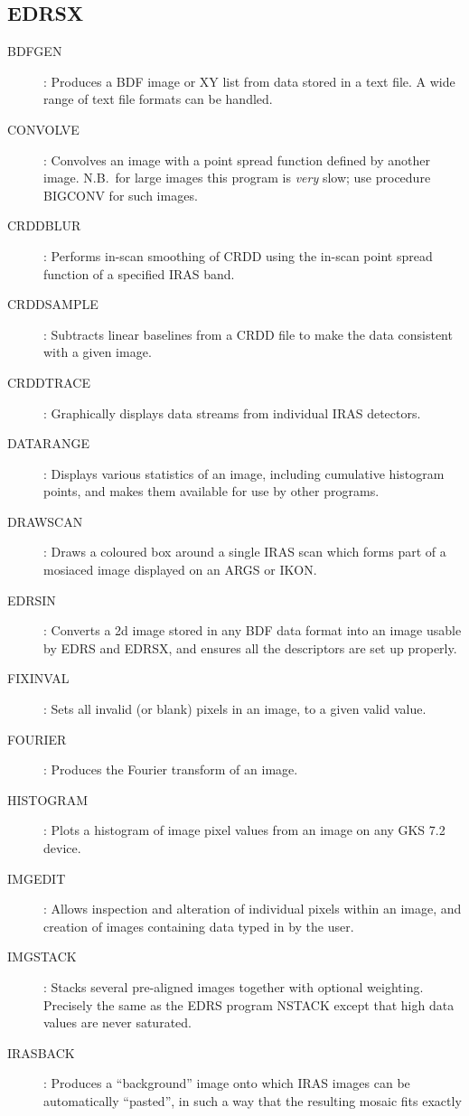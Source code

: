\subsection {EDRSX}
\begin{description}
\begin{description}
\item[BDFGEN]: Produces a BDF image or XY list from data stored in a text file.
A wide range of text file formats can be handled.
\item[CONVOLVE]: Convolves an image with a point spread function defined by
another image.
N.B.\ for large images this program is {\em very} slow; use procedure BIGCONV
for such images.
\item[CRDDBLUR]: Performs in-scan smoothing of CRDD using the in-scan
point spread function of a specified IRAS band.
\item[CRDDSAMPLE]: Subtracts linear baselines from a CRDD file to make the
data consistent with a given image.
\item[CRDDTRACE]: Graphically displays data streams from individual IRAS
detectors.
\item[DATARANGE]: Displays various statistics of an image, including cumulative
histogram points, and makes them available for use by other programs.
\item[DRAWSCAN]: Draws a coloured box around a single IRAS scan which forms
part of a mosiaced image displayed on an ARGS or IKON.
\item[EDRSIN]: Converts a 2d image stored in any BDF data format into an image
usable by EDRS and EDRSX, and ensures all the descriptors are set up properly.
\item[FIXINVAL]: Sets all invalid (or blank) pixels in an image, to a given
valid value.
\item[FOURIER]: Produces the Fourier transform of an image.
\item[HISTOGRAM]: Plots a histogram of image pixel values from an image on any
GKS 7.2 device.
\item[IMGEDIT]: Allows inspection and alteration of individual pixels within
an image, and creation of images containing data typed in by the user.
\item[IMGSTACK]: Stacks several pre-aligned images together with optional
weighting.
Precisely the same as the EDRS program NSTACK except that high data values are
never saturated.
\item[IRASBACK]: Produces a ``background'' image onto which IRAS images can be
automatically ``pasted'', in such a way that the resulting mosaic fits exactly

\end{description}
\end{description}
